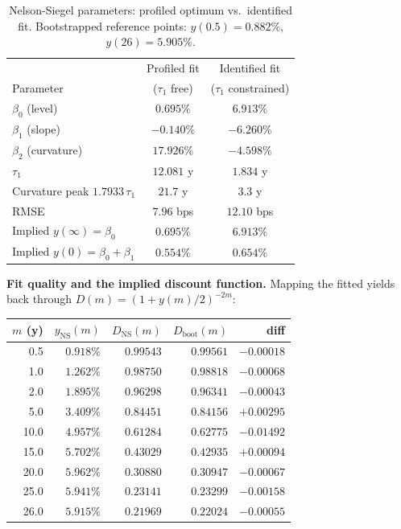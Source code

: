 \documentclass[11pt]{article}
\begin{document}
\begin{table}[htbp]
  \centering
  \begin{tabular}{lcc}
    \toprule
     & Profiled fit & Identified fit \\
    Parameter & ($\tau_1$ free) & ($\tau_1$ constrained) \\
    \midrule
    $\beta_0$ (level)      & $0.695\%$      & $6.913\%$ \\
    $\beta_1$ (slope)      & $-0.140\%$     & $-6.260\%$ \\
    $\beta_2$ (curvature)  & $17.926\%$     & $-4.598\%$ \\
    $\tau_1$               & $12.081$ y     & $1.834$ y \\
    Curvature peak $1.7933\,\tau_1$ & $21.7$ y & $3.3$ y \\
    RMSE                   & $7.96$ bps     & $12.10$ bps \\
    \midrule
    Implied $y(\infty)=\beta_0$ & $0.695\%$ & $6.913\%$ \\
    Implied $y(0)=\beta_0+\beta_1$ & $0.554\%$ & $0.654\%$ \\
    \bottomrule
  \end{tabular}
  \caption{Nelson-Siegel parameters: profiled optimum vs.\ identified fit. Bootstrapped reference
           points: $y(0.5)=0.882\%$, $y(26)=5.905\%$.}
  \label{tab:ns-params}
\end{table}
 
\textbf{Fit quality and the implied discount function.} Mapping the fitted yields back through
$D(m)=(1+y(m)/2)^{-2m}$:
 
\begin{center}
\begin{tabular}{rrrrr}
\toprule
$m$ (y) & $y_{\mathrm{NS}}(m)$ & $D_{\mathrm{NS}}(m)$ & $D_{\mathrm{boot}}(m)$ & diff \\
\midrule
 0.5 & $0.918\%$ & $0.99543$ & $0.99561$ & $-0.00018$ \\
 1.0 & $1.262\%$ & $0.98750$ & $0.98818$ & $-0.00068$ \\
 2.0 & $1.895\%$ & $0.96298$ & $0.96341$ & $-0.00043$ \\
 5.0 & $3.409\%$ & $0.84451$ & $0.84156$ & $+0.00295$ \\
10.0 & $4.957\%$ & $0.61284$ & $0.62775$ & $\mathbf{-0.01492}$ \\
15.0 & $5.702\%$ & $0.43029$ & $0.42935$ & $+0.00094$ \\
20.0 & $5.962\%$ & $0.30880$ & $0.30947$ & $-0.00067$ \\
25.0 & $5.941\%$ & $0.23141$ & $0.23299$ & $-0.00158$ \\
26.0 & $5.915\%$ & $0.21969$ & $0.22024$ & $-0.00055$ \\
\bottomrule
\end{tabular}
\end{center}
 
\end{document}
